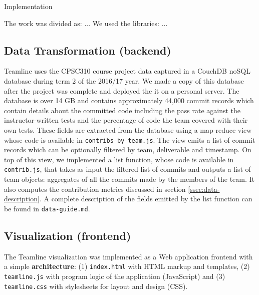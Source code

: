 \documentclass[../manifest.tex]{subfiles}
\begin{document}
Implementation

The work was divided as: ...
We used the libraries: ...

\subsection{Data Transformation (backend)}
Teamline uses the CPSC310 course project data captured in a CouchDB noSQL database during term 2 of the 2016/17 year. We made a copy of this database after the project was complete and deployed the it on a personal server. The database is over 14 GB and contains approximately 44,000 commit records which contain details about the committed code including the pass rate against the instructor-written tests and the percentage of code the team covered with their own tests. These fields are extracted from the database using a map-reduce view whose code is available in \texttt{contribs-by-team.js}. The view emits a list of commit records which can be optionally filtered by team, deliverable and timestamp. On top of this view, we implemented a list function, whose code is available in \texttt{contrib.js}, that takes as input the filtered list of commits and outputs a list of team objects: aggregates of all the commits made by the members of the team. It also computes the contribution metrics discussed in section \ref{ssec:data-description}. A complete description of the fields emitted by the list function can be found in \texttt{data-guide.md}.

\subsection{Visualization (frontend)}
The Teamline visualization was implemented as a Web application frontend with a simple \textbf{architecture}: (1) \texttt{index.html} with HTML markup and templates, (2) \texttt{teamline.js} with program logic of the application (JavaScript) and (3) \texttt{teamline.css} with stylesheets for layout and design (CSS).
\end{document}
